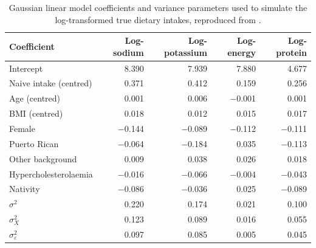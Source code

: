 \begin{table}[ht]
\centering
\caption{Gaussian linear model coefficients and variance parameters used to simulate the log-transformed true dietary intakes, reproduced from \citet{baldoni2021use}.}
\label{tab:app_meas_coef}
\begin{tabular}{lrrrr}
\hline
Coefficient & Log-sodium & Log-potassium & Log-energy & Log-protein \\
\hline
Intercept & 8.390 & 7.939 & 7.880 & 4.677 \\
Naive intake (centred) & 0.371 & 0.412 & 0.159 & 0.256 \\
Age (centred) & 0.001 & 0.006 & $-$0.001 & 0.001 \\
BMI (centred) & 0.018 & 0.012 & 0.015 & 0.017 \\
Female & $-$0.144 & $-$0.089 & $-$0.112 & $-$0.111 \\
Puerto Rican & $-$0.064 & $-$0.184 & 0.035 & $-$0.113 \\
Other background & 0.009 & 0.038 & 0.026 & 0.018 \\
Hypercholesterolaemia & $-$0.016 & $-$0.066 & $-$0.004 & $-$0.043 \\
Nativity & $-$0.086 & $-$0.036 & 0.025 & $-$0.089 \\
\hline
$\sigma^2$ & 0.220 & 0.174 & 0.021 & 0.100 \\
$\sigma^2_X$ & 0.123 & 0.089 & 0.016 & 0.055 \\
$\sigma^2_\varepsilon$ & 0.097 & 0.085 & 0.005 & 0.045 \\
\hline
\end{tabular}
\end{table}

